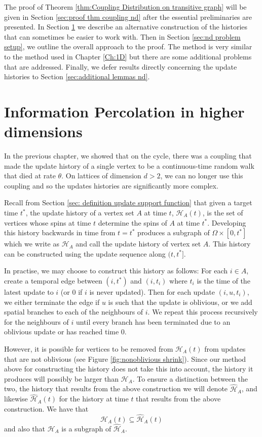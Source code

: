 The proof of Theorem \ref{thm:Coupling Distribution on transitive graph} will be given in Section \ref{sec:proof thm coupling nd} after the essential preliminaries are presented. In Section \ref{sec:information percolation in higher dimensions} we describe an alternative construction of the histories that can sometimes be easier to work with. Then in Section \ref{sec:nd problem setup}, we outline the overall approach to the proof. The method is very similar to the method used in Chapter \ref{Ch:1D} but there are some additional problems that are addressed. Finally, we defer results directly concerning the update histories to Section \ref{sec:additional lemmas nd}.

\section{Information Percolation in higher dimensions}
\label{sec:information percolation in higher dimensions}
In the previous chapter, we showed that on the cycle, there was a coupling that made the update history of a single vertex to be a continuous-time random walk that died at rate $\theta$. On lattices of dimension $d > 2$, we can no longer use this coupling and so the updates histories are significantly more complex. 

Recall from Section \ref{sec: definition update support function} that given a target time $t^*$, the update history of a vertex set $A$ at time $t$, $\mathcal{H}_A(t)$, is the set of vertices whose spins at time $t$ determine the spins of $A$ at time $t^*$. Developing this history backwards in time from $t = t^*$ produces a subgraph of $\Omega \times [0, t^*]$ which we write as $\mathcal{H}_A$ and call the update history of vertex set $A$. This history can be constructed using the update sequence along $(t, t^*]$. 

In practise, we may choose to construct this history as follows: For each $i \in A$, create a temporal edge between $(i, t^*)$ and $(i, t_i)$ where $t_i$ is the time of the latest update to $i$ (or $0$ if $i$ is never updated). Then for each update $(i, u, t_i)$, we either terminate the edge if $u$ is such that the update is oblivious, or we add spatial branches to each of the neighbours of $i$. We repeat this process recursively for the neighbours of $i$ until every branch has been terminated due to an oblivious update or has reached time $0$.

However, it is possible for vertices to be removed from $\mathcal{H}_A(t)$ from updates that are not oblivious (see Figure \ref{fig:nonoblivious shrink}). Since our method above for constructing the history does not take this into account, the history it produces will possibly be larger than $\mathcal{H}_A$. To ensure a distinction between the two, the history that results from the above construction we will denote $\hat{\mathcal{H}}_A$, and likewise $\hat{\mathcal{H}}_A(t)$ for the history at time $t$ that results from the above construction. We have that
\begin{equation}
	\mathcal{H}_A(t) \subseteq \hat{\mathcal{H}}_A(t)
\end{equation}
and also that $\mathcal{H}_A$ is a subgraph of $\hat{\mathcal{H}}_A$.

